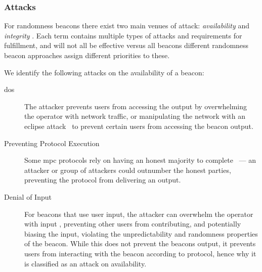 
\subsubsection{Attacks}\label{ssub:security_objectives}
For randomness beacons there exist two main venues of attack: \emph{availability} and \emph{integrity} .
Each term contains multiple types of attacks and requirements for fulfillment, and will not all be effective versus all beacons different randomness beacon approaches assign different priorities to these.

We identify the following attacks on the availability of a beacon:

\begin{description}
    \item[\Acrfull{dos}] The attacker prevents users from accessing the output by overwhelming the operator with network traffic, or manipulating the network with an eclipse attack~\cite{Singh06eclipseattacks} to prevent certain users from accessing the beacon output.
    \item[Preventing Protocol Execution] Some \gls{mpc} protocols rely on having an honest majority to complete~\cite{cascudo2017scrape} --- an attacker or group of attackers could outnumber the honest parties, preventing the protocol from delivering an output.
    \item[Denial of Input] For beacons that use user input, the attacker can overwhelm the operator with input  , preventing other users from contributing, and potentially biasing the input, violating the unpredictability and randomness properties of the beacon.
    While this does not prevent the beacons output, it prevents users from interacting with the beacon according to protocol, hence why it is classified as an attack on availability.
\end{description}

